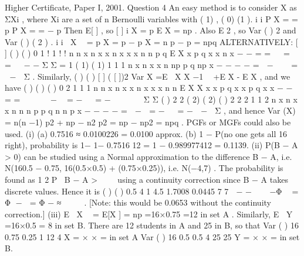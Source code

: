 \documentclass[a4paper,12pt]{article}
\begin{document}
Higher Certificate, Paper I, 2001. Question 4
An easy method is to consider X as ΣXi , where Xi are a set of n Bernoulli variables
with ( 1) , ( 0) (1 ). i i P X = = p P X = = − p Then E[ ] , so [ ] i X = p E X = np .
Also E 2 , so Var ( ) 2 and Var ( ) ( 2 ) . i i X  = p X = p − p X = n p − p = npq
ALTERNATIVELY: [ ] ( ) ( ) 0 1
!
1 ! !
n n x n x
x n x
x x
n n p q E X x p q
x x n x
−
−
= =
 
=   =   − −
Σ Σ
= 1 ( 1) ( 1)
1
1
1
n
x n x
x
n
np p q np
x
− − − −
=
 − 
  =  − 
Σ .
Similarly, ( ) ( ) [ ] ( [ ])2 Var X =E X X −1  +E X - E X , and we have
( ) ( ) ( )
0 2
1 1 1
n n
x n x x n x
x x
n n
E X X x x p q x x p q
x x
− −
= =
   
 −  = −   = −  
   
Σ Σ
( ) 2 2 ( 2) ( 2) ( ) 2
2
2
1 1
2
n
x n x
x
n
n n p p q n n p
x
− − − −
=
 − 
= −   = −  − 
Σ ,
and hence Var (X) = n(n −1) p2 + np − n2 p2 = np − np2 = npq .
PGFs or MGFs could also be used.
(i) (a) 0.7516 ≈ 0.0100226 = 0.0100 approx.
(b) 1 − P(no one gets all 16 right), probability is { }1− 1− 0.7516 12
= 1 − {0.9899774}12 = 0.1139.
(ii) P(B − A > 0) can be studied using a Normal approximation to the difference
B − A, i.e. N(16{0.5 − 0.75}, 16{(0.5×0.5) + (0.75×0.25)}), i.e. N(−4,7) .
The probability is found as 1
2
P B − A > 
 
using a continuity correction since B − A
takes discrete values.
Hence it is ( ) ( ) 0.5 4 1 4.5 1.7008 0.0445
7 7
 − −    −Φ  = Φ −  = Φ − ≈
   
.
[Note: this would be 0.0653 without the continuity correction.]
(iii) E X  = E[X ] = np =16×0.75 =12 in set A .
Similarly, E Y  =16×0.5 = 8 in set B.
There are 12 students in A and 25 in B, so that
Var ( ) 16 0.75 0.25 1
12 4
X = × × = in set A
Var ( ) 16 0.5 0.5 4
25 25
Y = × × = in set B.
\end{document}
